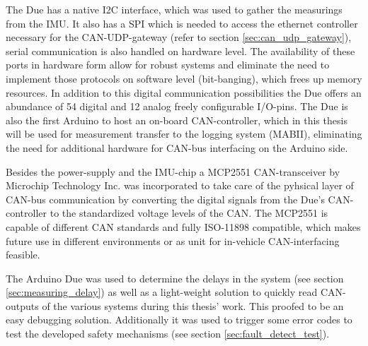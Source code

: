 \documentclass[ExampleMasters.tex]{subfiles}
\begin{document}
The Due has a native \gls{I2C} interface, which was used to gather the measurings from the \gls{IMU}. It also has a \gls{SPI} which is needed to access the ethernet controller necessary for the \gls{CAN}-\Gls{UDP}-gateway (refer to section \ref{sec:can_udp_gateway}), serial communication is also handled on hardware level. The availability of these ports in hardware form allow for robust systems and eliminate the need to implement those protocols on software level (bit-banging), which frees up memory resources. In addition to this digital communication possibilities the Due offers an abundance of 54 digital and 12 analog freely configurable I/O-pins. The Due is also the first Arduino to host an on-board \gls{CAN}-controller, which in this thesis will be used for measurement transfer to the logging system (\gls{MABII}), eliminating the need for additional hardware for \gls{CAN}-bus interfacing on the Arduino side.

Besides the power-supply and the \gls{IMU}-chip a MCP2551 CAN-transceiver by Microchip Technology Inc. was incorporated to take care of the pyhsical layer of CAN-bus communication by converting the digital signals from the Due's CAN-controller to the standardized voltage levels of the \gls{CAN}. The MCP2551 is capable of different \gls{CAN} standards and fully ISO-11898 compatible, which makes future use in different environments or as unit for in-vehicle CAN-interfacing feasible.

The Arduino Due was used to determine the delays in the system (see section \ref{sec:measuring_delay}) as well as a light-weight solution to quickly read \gls{CAN}-outputs of the various systems during this thesis' work. This proofed to be an easy debugging solution. Additionally it was used to trigger some error codes to test the developed safety mechanisms (see section \ref{sec:fault_detect_test}). 

\end{document}
